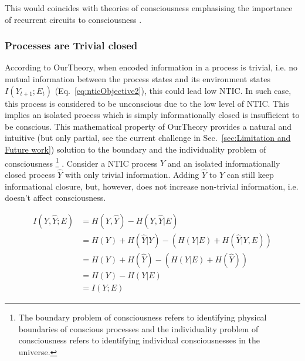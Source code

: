 \documentclass[utf8]{article}
\begin{document}
        		
        		This would coincides with theories of consciousness emphasising the importance of recurrent circuits to consciousness \citep{lamme2006towards, edelman1992bright, tononi2008neural}.

            \subsubsection*{Processes are Trivial closed}
                According to \ac{OurTheory}, when encoded information in a process is trivial, i.e. no mutual information between the process states and its environment states $I(Y_{t+1};E_{t})$ (Eq.~\ref{eq:nticObjective2}), this could lead low NTIC. In such case, this process is considered to be unconscious due to the low level of NTIC. This implies an isolated process which is simply informationally closed is insufficient to be conscious. 
                This mathematical property of \ac{OurTheory} provides a natural and intuitive (but only partial, see the current challenge in  Sec.~\ref{sec:Limitation and Future work}) solution to the boundary and the individuality problem of consciousness
                    \footnote{The boundary problem of consciousness refers to identifying physical boundaries of conscious processes and the individuality problem of consciousness refers to identifying individual consciousnesses in the universe.}
                \citep{Raymont2006-RAYUOC}. Consider a NTIC process $Y$ and an isolated informationally closed process $\hat{Y}$ with only trivial information. Adding $\hat{Y}$ to $Y$ can still keep informational closure, but, however, does not increase non-trivial information, i.e. doesn't affect consciousness. 
                
    			\begin{equation}
    			    \begin{aligned}
                        I(Y,\hat{Y};E) & = H(Y,\hat{Y}) - H(Y,\hat{Y}|E) \\
                                       & = H(Y) + H(\hat{Y}|Y) - (H(Y|E)+H(\hat{Y}|Y,E)) \\
                                       & = H(Y) + H(\hat{Y}) - (H(Y|E)+H(\hat{Y})) \\
                                       & = H(Y) - H(Y|E)\\
                                       & = I(Y;E)				
    				\end{aligned}
    			\end{equation}
                
\end{document}
